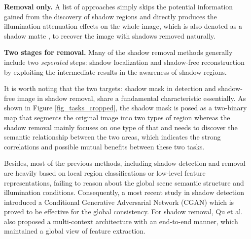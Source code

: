 \documentclass[10pt,twocolumn,letterpaper]{article}
\begin{document}
\textbf{Removal only.} A list of approaches \cite{finlayson2006removal,finlayson2009entropy,zhang2015shadow,gryka2015learning,tappen2003recovering,arbel2011shadow,wu2007natural,liu2008texture,qudeshadownet} simply skips the potential information gained from the discovery of shadow regions and directly produces the illumination attenuation effects on the whole image, which is also denoted as a shadow matte \cite{qudeshadownet}, to recover the image with shadows removed naturally.

\textbf{Two stages for removal. } Many of the shadow removal methods \cite{guo2011single,guo2013paired,khan2016automatic,gong2014interactive,vicente2017leave} generally include two \emph{seperated} steps: shadow localization and shadow-free reconstruction by exploiting the intermediate results in the awareness of shadow regions.


It is worth noting that the two targets: shadow mask in detection and shadow-free image in shadow removal, share a fundamental characteristic essentially. As shown in Figure \ref{fig_tasks_cropped}, the shadow mask is posed as a two-binary map that segments the original image into two types of region whereas the shadow removal mainly focuses on one type of that and needs to discover the semantic relationship between the two areas, which indicates the strong correlations and possible mutual benefits between these two tasks.


Besides, most of the previous methods, including shadow detection \cite{huang2011characterizes,lalonde2010detecting,vicente2016noisy,zhu2010learning,khan2014automatic,vicente2015leave} and removal \cite{gong2014interactive,wu2007natural,arbel2011shadow} are heavily based on local region classifications or low-level feature representations, failing to reason about the global scene semantic structure and illumination conditions. Consequently, a most recent study \cite{nguyen2017shadow} in shadow detection introduced a Conditional Generative Adversarial Network (CGAN) \cite{mirza2014conditional} which is proved to be effective for the global consistency. For shadow removal, Qu et al. \cite{qudeshadownet} also proposed a multi-context architecture with an end-to-end manner, which maintained a global view of feature extraction. 
\end{document}
